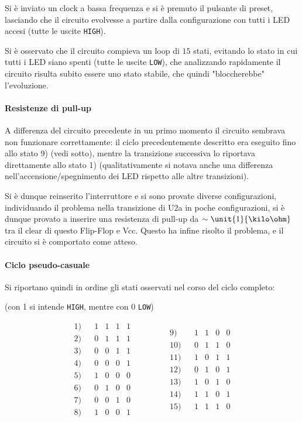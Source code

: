 \documentclass[a4paper,10pt]{article}
\def\code#1{\texttt{#1}}
\begin{document}
Si è inviato un clock a bassa frequenza e si è premuto il pulsante di preset, lasciando che il circuito evolvesse a partire dalla configurazione con tutti i LED accesi (tutte le uscite \code{HIGH}).

Si è osservato che il circuito compieva un loop di $15$ stati, evitando lo stato in cui tutti i LED siano spenti (tutte le uscite \code{LOW}), che analizzando rapidamente il circuito risulta subito essere uno stato stabile, che quindi "bloccherebbe" l'evoluzione.

\paragraph{Resistenze di pull-up}A differenza del circuito precedente in un primo momento il circuito sembrava non funzionare correttamente: il ciclo precedentemente descritto era eseguito fino allo stato 9) (vedi sotto), mentre la transizione successiva lo riportava direttamente allo stato 1) (qualitativamente si notava anche una differenza nell'accensione/spegnimento dei LED rispetto alle altre transizioni).

Si è dunque reinserito l'interruttore e si sono provate diverse configurazioni, individuando il problema nella transizione di U$2$a in poche configurazioni, si è dunque provato a inserire una resistenza di pull-up da $\sim \unit{1}{\kilo\ohm}$ tra il clear di questo Flip-Flop e Vcc.
Questo ha infine risolto il problema, e il circuito si è comportato come atteso.

\paragraph{Ciclo pseudo-casuale} Si riportano quindi in ordine gli stati osservati nel corso del ciclo completo:

(con 1 si intende \code{HIGH}, mentre con 0 \code{LOW})

\begin{equation*}
\begin{matrix}
1)	&		&	1	&	1	&	1	&	1	\\
2)	&		&	0	&	1	&	1	&	1	\\
3)	&		&	0	&	0	&	1	&	1	\\
4)	&		&	0	&	0	&	0	&	1	\\
5)	&		&	1	&	0	&	0	&	0	\\
6)	&		&	0	&	1	&	0	&	0	\\
7)	&		&	0	&	0	&	1	&	0	\\
8)	&		&	1	&	0	&	0	&	1	\\
\end{matrix}
\qquad \qquad
\begin{matrix}
9)	&		&	1	&	1	&	0	&	0	\\
10)	&		&	0	&	1	&	1	&	0	\\
11)	&		&	1	&	0	&	1	&	1	\\
12)	&		&	0	&	1	&	0	&	1	\\
13)	&		&	1	&	0	&	1	&	0	\\
14)	&		&	1	&	1	&	0	&	1	\\
15)	&		&	1	&	1	&	1	&	0	\\
\end{matrix}
\end{equation*}
\end{document}
